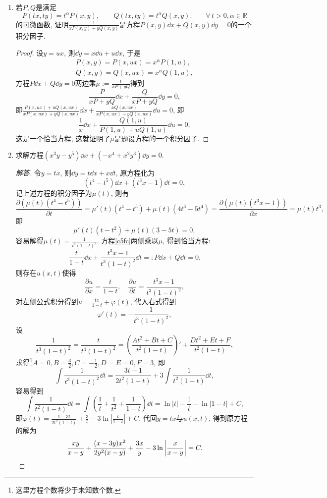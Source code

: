 \begin{5b}
\begin{enumerate}
\item 若\(P,Q\)是满足\[P(tx,ty)=t^{\alpha}P(x,y),\qquad Q(tx,ty)=t^{\alpha}Q(x,y).\qquad\forall\, t>0,\alpha\in\mathbb{R}\]
的可微函数, 证明\(\frac{1}{xP(x,y)+yQ(x,y)}\)是方程\(P(x,y)\dd x+Q(x,y)\dd y=0\)的一个积分因子.
\begin{proof}
设\(y=ux\), 则\(\dd y=x\dd u+u\dd x\), 于是\begin{gather*}
P(x,y)=P(x,ux)=x^{\alpha}P(1,u),\\
Q(x,y)=Q(x,ux)=x^{\alpha}Q(1,u),
\end{gather*}方程\(P\dd x+Q\dd y=0\)两边乘\(\mu:=\frac{1}{xP+yQ}\)得到
\[\frac{P}{xP+yQ}\dd x+\frac{Q}{xP+yQ}\dd y=0,\]
即\(\frac{P(x,ux)+uQ(x,ux)}{xP(x,ux)+yQ(x,ux)}\dd x+\frac{xQ(x,ux)}{xP(x,ux)+yQ(x,ux)}\dd u=0\), 即
\[\frac{1}{x}\dd x+\frac{Q(1,u)}{P(1,u)+uQ(1,u)}\dd u=0,\]
这是一个恰当方程, 这就证明了\(\mu\)是题设方程的一个积分因子.
\end{proof}
\item 求解方程\((x^3y-y^5)\dd x+(-x^4+x^2y^3)\dd y=0.\)
\begin{proof}[解答]
令\(y=tx\), 则\(\dd y=t\dd x+x\dd t\), 原方程化为
\begin{equation}\label{c5fc}%
\left(t^4-t^5\right)\dd x+\left(t^3x-1\right)\dd t=0,
\end{equation}
记上述方程的积分因子为\(\mu(t)\), 则有
\[\frac{\partial\left(\mu(t)(t^4-t^5)\right)}{\partial t}=\mu'(t)(t^4-t^5)+\mu(t)(4t^3-5t^4)
=\frac{\partial\left(\mu(t)(t^3x-1)\right)}{\partial x}=\mu(t)t^3,\]
即\[\mu'(t)(t-t^2)+\mu(t)(3-5t)=0,\]
容易解得\(\mu(t)=\frac{1}{t^3(1-t)^2}\). 方程\eqref{c5fc}两侧乘以\(\mu\), 得到恰当方程:
\[\frac{t}{1-t}\dd x+\frac{t^3x-1}{t^3(1-t)^2}\dd t=:P\dd x+Q\dd t=0.\]
则存在\(u(x,t)\)使得\[\frac{\partial u}{\partial x}=\frac{t}{1-t},\quad \frac{\partial u}{\partial t}=\frac{t^3x-1}{t^3(1-t)^2},\]
对左侧公式积分得到\(u=\frac{tx}{1-t}+\varphi(t)\), 代入右式得到
\[\varphi'(t)=-\frac{1}{t^3(1-t)^2},\]
设\[\frac{1}{t^3(1-t)^2}=\frac{t}{t^4(1-t)^2}=\left(\frac{At^2+Bt+C}{t^2(1-t)}\right)'+\frac{Dt^2+Et+F}{t^2(1-t)},\]
求得\footnote{这里方程个数将少于未知数个数.}\(A=0,B=\frac{3}{2},C=-\frac{1}{2},D=E=0,F=3\), 即
\[\int\frac{1}{t^3(1-t)^2}\dd t=\frac{3t-1}{2t^2(1-t)}+3\int\frac{1}{t^2(1-t)}\dd t,\]
容易得到\[\int\frac{1}{t^2(1-t)}\dd t=\int\left(\frac{1}{t}+\frac{1}{t^2}+\frac{1}{1-t}\right)\dd t=\ln|t|-\frac{1}{t}-\ln|1-t|+C,\]
即\(\varphi(t)=\frac{1-3t}{2t^2(1-t)}+\frac{3}{t}-3\ln\left|\frac{t}{1-t}\right|+C\), 代回\(y=tx\)与\(u(x,t)\), 得到原方程的解为
\[\frac{xy}{x-y}+\frac{(x-3y)x^2}{2y^2(x-y)}+\frac{3x}{y}-3\ln\left|\frac{x}{x-y}\right|=C.\qedhere\]
\end{proof}
\printfootnotes
\end{enumerate}
\end{5b}